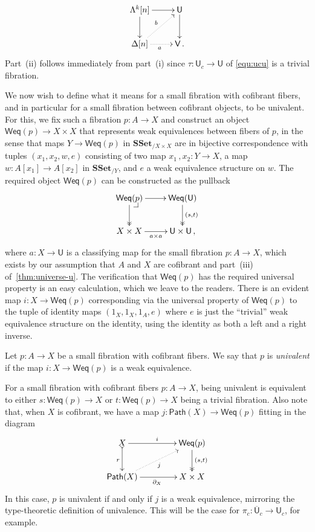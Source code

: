 \documentclass[reqno,10pt,a4paper,oneside]{amsart}
\makeatletter
\renewenvironment{proof}[1][\proofname] {\par\pushQED{\qed}\normalfont\topsep6\p@\@plus6\p@\relax\trivlist\item[\hskip\labelsep\bf#1\@addpunct{.}]\ignorespaces}{\popQED\endtrivlist\@endpefalse}
\numberwithin{equation}{section}
\theoremstyle{mythm}
\theoremstyle{mydef}
\theoremstyle{myrmk}
\newcommand{\pullback}[1]{\save*!/#1-1.2pc/#1:(-1,1)@^{|-}\restore}
\newcommand{\drpullback}{\pullback{dr}}
\newcommand{\myemph}{\textit}
\newcommand{\co}{\colon}
\newcommand{\SSet}{\mathbf{SSet}}
\newcommand{\UU}{\overline{\mathsf{U}}}
\newcommand{\U}{\mathsf{U}}
\newcommand{\V}{\mathsf{V}}
\newcommand{\Weq}{\mathsf{Weq}}
\newcommand{\Path}{\mathsf{Path}}
\makeatother
\begin{document}
\begin{proof}
\[\xymatrix{
\Lambda^k[n] \ar[r] \ar[d] & \U \ar[d] \\
\Delta[n] \ar@{.>}[r]_a \ar@{.>}[ur]^b & \V \, . \\
}\]
Part~(ii) follows immediately from part~(i) since $\tau \co \U_c \to \U$ of \eqref{equ:ucu} is a trivial fibration.
\end{proof}




We now wish to define  what it means for a small fibration with cofibrant fibers, and in particular for a small fibration between cofibrant objects, to  be univalent. For this, we fix such a fibration $p \co A \to X$ and construct an object $\Weq(p) \to X \times X$ that represents weak
equivalences between fibers of $p$, in the sense that maps $Y \to \Weq(p)$ in $\SSet_{/X \times X}$ are in bijective correspondence with tuples $(x_1, x_2, w,e)$ consisting of two map $x_1 \, , x_2 \co Y \to X$, a map $w \co A[x_1]
\to A[x_2]$ in $\SSet_{/Y}$, and $e$ a weak equivalence structure on $w$. The required object $\Weq(p)$ can be constructed as the pullback
\[
\xymatrix{
\Weq(p) \drpullback \ar[r] \ar@{->>}[d] & \Weq(\U) \ar@{->>}[d]^{(s,t)} \\
X \times X \ar[r]_{a \times a} & \U \times \U \, ,}
\]
where $a \co X \to \U$ is a classifying map for the small fibration $p \co A \to X$, which exists by our assumption
that $A$ and $X$ are cofibrant and part~(iii) of~\cref{thm:universe-u}. The verification that $\Weq(p)$
has the required universal property is an easy calculation, which we leave to the readers. There is an
evident map $i \co X \to \Weq(p)$ corresponding via the universal property of $\Weq(p)$ to the tuple of identity maps $(1_X, 1_X, 1_A,e)$ where $e$ is just the ``trivial'' weak equivalence structure on the identity, using the identity as both a left and a right inverse.




\begin{definition}  \label{equ:characterisations-of-univalence} Let $p \co A \to X$ be a small fibration with cofibrant fibers. We say that $p$ is \myemph{univalent} if the map $i \co X \to \Weq(p)$ is a weak equivalence. 
\end{definition}

\smallskip

For a small fibration with cofibrant fibers $p \co A \to X$, being univalent is equivalent to
either $s \co \Weq(p) \to X$ or $t \co \Weq(p) \to X$ being a trivial fibration.  Also note that, when $X$
is cofibrant, we have a map $j \co \Path(X) \to \Weq(p)$ fitting in the diagram
\[
\xymatrix@C=1.5cm{
X \ar[r]^i \ar@{>->}[d]_r & \Weq(p) \ar@{->>}[d]^{(s,t)} \\
\Path(X) \ar[r]_{\partial_X}  \ar@{.>}[ur]_{j} &  X \times X }
\]
In this case, $p$ is univalent if and only if $j$ is a weak equivalence, mirroring the type-theoretic
definition of univalence. This will be the case for $\pi_c \co \UU_c \to \U_c$, for example.
\end{document}
